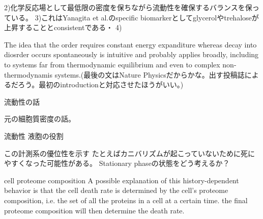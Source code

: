 2)化学反応場として最低限の密度を保ちながら流動性を確保するバランスを保っている。
3)これはYanagita et al.のspecific biomarkerとしてglycerolやtrehaloseが上昇することとconsistentである・
4)

 The idea that the order requires constant energy expanditure whereas decay into diosrder occurs spontaneously is intuitive and probably applies broadly, including to systems far from thermodynamic equilibrium and even to complex non-thermodynamis systems.(最後の文はNature Physicsだからかな。出す投稿誌によるだろう。最初のintroductionと対応させたほうがいい。)

流動性の話

元の細胞質密度の話。
 
流動性
液胞の役割

この計測系の優位性を示す
たとえばカニバリズムが起こっていないために死にやすくなった可能性がある。
Stationary phaseの状態をどう考えるか？





cell proteome composition
A possible explanation of this history-dependent behavior is that the cell death rate is determined by the cell’s proteome composition, i.e. the set of all the proteins in a cell at a certain time.
the final proteome composition will then determine the death rate.




